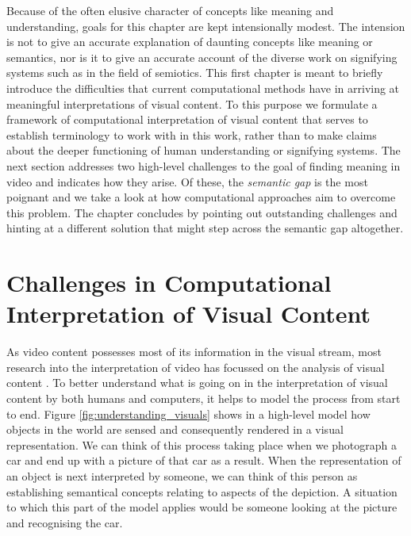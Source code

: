 Because of the often elusive character of concepts like meaning and understanding, goals for this chapter are kept intensionally modest. The intension is not to give an accurate explanation of daunting concepts like meaning or semantics, nor is it to give an accurate account of the diverse work on signifying systems such as in the field of semiotics. This first chapter is meant to briefly introduce the difficulties that current computational methods have in arriving at meaningful interpretations of visual content. To this purpose we formulate a framework of computational interpretation of visual content that serves to establish terminology to work with in this work, rather than to make claims about the deeper functioning of human understanding or signifying systems. The next section addresses two high-level challenges to the goal of finding meaning in video and indicates how they arise. Of these, the \emph{semantic gap} is the most poignant and we take a look at how computational approaches aim to overcome this problem. The chapter concludes by pointing out outstanding challenges and hinting at a different solution that might step across the semantic gap altogether.


\section{Challenges in Computational Interpretation of Visual Content}

As video content possesses most of its information in the visual stream, most research into the interpretation of video has focussed on the analysis of visual content \cite[ch.~2]{Snoek:2009dq}. To better understand what is going on in the interpretation of visual content by both humans and computers, it helps to model the process from start to end. Figure \ref{fig:understanding_visuals} shows in a high-level model how objects in the world are sensed and consequently rendered in a visual representation. We can think of this process taking place when we photograph a car and end up with a picture of that car as a result. When the representation of an object is next interpreted by someone, we can think of this person as establishing semantical concepts relating to aspects of the depiction. A situation to which this part of the model applies would be someone looking at the picture and recognising the car.

